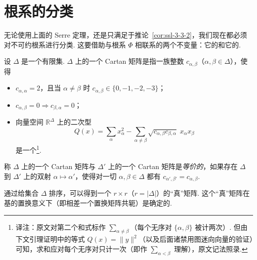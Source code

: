 \section{根系的分类}\label{sec:ssl-3-4}
\newcommand{\dknode}[2]{\node[draw,circle,fill=white,inner sep=0pt,outer sep=0pt,minimum size=4pt] at (#1,#2) {};}
\newcommand{\dkdbl}[2]{\begin{pgfonlayer}{background}\draw ({#1+0.07},0.028) -- ({#2-0.07},0.028);\end{pgfonlayer}\begin{pgfonlayer}{background}\draw ({#1+0.07},-0.028) -- ({#2-0.07},-0.028);\end{pgfonlayer}}
\newcommand{\dkdbla}[3]{\dkdbl{#1}{#2}\node[inner sep=0pt] at ({(#1+#2)/2},0) {$\scriptstyle #3$};}
\newcommand{\dktri}[2]{\begin{pgfonlayer}{background}\draw ({#1+0.07},0.039) -- ({#2-0.07},0.039);\end{pgfonlayer}\begin{pgfonlayer}{background}\draw ({#1+0.07},0) -- ({#2-0.07},0);\end{pgfonlayer}\begin{pgfonlayer}{background}\draw ({#1+0.07},-0.039) -- ({#2-0.07},-0.039);\end{pgfonlayer}}
无论使用上面的 Serre 定理，还是只满足于推论~\ref{cor:ssl-3-3-2}，我们现在都必须对不可约根系进行分类. 这要借助与根系 $\Phi$ 相联系的两个不变量：它的和它的.
\begin{definition}[Cartan 矩阵]\label{def:ssl-3-4-1}
设 $\Delta$ 是一个有限集. $\Delta$ 上的一个 Cartan 矩阵是指一族整数 $c_{\alpha,\beta}$（$\alpha,\beta\in\Delta$），使得
\begin{itemize}
\item[(C1)] $c_{\alpha,\alpha}=2$，且当 $\alpha\neq\beta$ 时 $c_{\alpha,\beta}\in\{0,-1,-2,-3\}$；
\item[(C2)] $c_{\alpha,\beta}=0\Rightarrow c_{\beta,\alpha}=0$；
\item[(C3)] 向量空间 $\mathbb{R}^{\Delta}$ 上的二次型
\[Q(x)=\sum_{\alpha}x_{\alpha}^{2}-\sum_{\alpha\neq\beta}\sqrt{c_{\alpha,\beta}c_{\beta,\alpha}}\;x_{\alpha}x_{\beta}\]
是一个\footnote{译注：原文对第二个和式标作 $\sum_{\alpha\neq\beta}$（每个无序对 $\{\alpha,\beta\}$ 被计两次）. 但由下文引理证明中的等式 $Q(x)=\lVert y\rVert^{2}$（以及后面诸禁用图迷向向量的验证）可知，求和应对每个无序对只计一次（即作 $\sum_{\alpha<\beta}$ 理解），原文记法照录.}.
\end{itemize}
称 $\Delta$ 上的一个 Cartan 矩阵与 $\Delta'$ 上的一个 Cartan 矩阵是\emph{等价的}，如果存在 $\Delta$ 到 $\Delta'$ 上的双射 $\alpha\mapsto\alpha'$，使得对一切 $\alpha,\beta\in\Delta$ 都有 $c_{\alpha',\beta'}=c_{\alpha,\beta}$.

通过给集合 $\Delta$ 排序，可以得到一个 $r\times r$（$r=|\Delta|$）的``真''矩阵. 这个``真''矩阵在基的置换意义下（即相差一个置换矩阵共轭）是确定的.
\end{definition}
